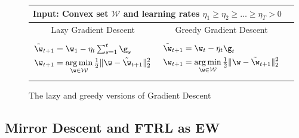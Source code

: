 \documentclass{colt2018} %
\DeclareMathOperator*{\argmin}{arg\,min}
\newcommand{\domainw}{\mathcal{W}}
\begin{document}
% 
\begin{figure}
{%
\centering \small
\begin{tabular}{| c | c | r |}
\hline
\multicolumn{2}{|l|}{\textbf{Input:} Convex set $\domainw$ and learning rates $\eta_1 \geq  \eta_{2} \geq \ldots \geq
  \eta_T > 0$} \\
\hline
Lazy Gradient Descent & Greedy Gradient Descent \\
\hline
\parbox{7cm}{ \vspace{-0.35cm} \begin{equation*}
\begin{split}
\tilde{\w}_{t+1} &= \textstyle \w_1 - \eta_t \sum_{s=1}^t \g_s \\
\w_{t+1} &= \argmin_{\w \in \domainw} \tfrac{1}{2}\|\w - \tilde{\w}_{t+1}\|^2_2
\end{split}
\end{equation*} \vspace{-0.39cm}} & \parbox{7cm}{ \vspace{-0.35cm} \begin{equation*}
\begin{split}
\tilde{\w}_{t+1} &= \w_t - \eta_t \g_t \\
\w_{t+1} &= \argmin_{\w \in \domainw} \tfrac{1}{2}\|\w - \tilde{\w}_{t+1}\|^2_2
\end{split}
\end{equation*} \vspace{-0.30cm}} \\
\hline
\end{tabular}
}
\caption{The lazy and greedy versions of Gradient Descent}\label{alg:GD}
\end{figure}

% 
% 
% 
% 
% 
% 
% 
% 
% 
% 
% 
% 
% 
% 
% 
% 
% 
% 
% 
% 
% 
% 
% 
% 
% 
% 
% 
% 
% 
% 

\subsection{Mirror Descent and FTRL as EW} 
\label{sec:MD}
\end{document}
